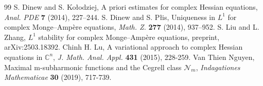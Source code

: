 \documentclass[10pt,a4paper]{amsart}
\begin{document}
\begin{thebibliography}{99}
 S. Dinew and S. Ko{\l}odziej, A priori estimates for complex Hessian equations, \emph{Anal. PDE} \textbf{7} (2014), 227--244.
 S. Dinew and S. P{\l}is, Uniqueness in $L^1$ for complex Monge--Amp\`ere equations, \emph{Math. Z.} \textbf{277} (2014), 937--952.
 S. Liu and L. Zhang, $L^1$ stability for complex Monge--Amp\`ere equations, preprint, arXiv:2503.18392.
 Chinh H. Lu, A variational approach to complex Hessian equations in $\mathbb{C}^n$, \emph{J. Math. Anal. Appl.} \textbf{431} (2015), 228-259.
 Van Thien Nguyen, Maximal m-subharmonic functions and the Cegrell class $\mathcal{N}_m$, \emph{Indagationes Mathematicae} \textbf{30} (2019), 717-739.
\end{thebibliography}
\end{document}
